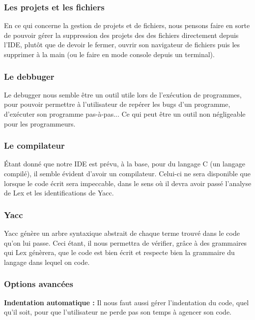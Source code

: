 \documentclass[a4paper,12pt]{article}
\begin{document}
	\subsubsection*{Les projets et les fichiers}
	
		En ce qui concerne la gestion de projets et de fichiers, nous pensons faire en sorte de pouvoir gérer la suppression des projets des des fichiers directement depuis l'IDE, plutôt que de devoir le fermer, ouvrir son navigateur de fichiers puis les supprimer à la main (ou le faire en mode console depuis un terminal).
		
	\subsubsection*{Le debbuger}
	
		Le debugger nous semble être un outil utile lors de l'exécution de programmes, pour pouvoir permettre à l'utilisateur de repérer les bugs d'un programme, d'exécuter son programme pas-à-pas... Ce qui peut être un outil non négligeable pour les programmeurs.
		
	\subsubsection*{Le compilateur}
	
		Étant donné que notre IDE est prévu, à la base, pour du langage C (un langage compilé), il semble évident d'avoir un compilateur. Celui-ci ne sera disponible que lorsque le code écrit sera impeccable, dans le sens où il devra avoir passé l'analyse de Lex et les identifications de Yacc.
		
	\subsubsection*{Yacc}
	
		Yacc génère un arbre syntaxique abstrait de chaque terme trouvé dans le code qu'on lui passe. Ceci étant, il nous permettra de vérifier, grâce à des grammaires qui Lex génèrera, que le code est bien écrit et respecte bien la grammaire du langage dans lequel on code.
		
	\subsubsection*{Options avancées}
	
		\textbf{Indentation automatique :}
		Il nous faut aussi gérer l'indentation du code, quel qu'il soit, pour que l'utilisateur ne perde pas son temps à agencer son code.\\
		
\end{document}
